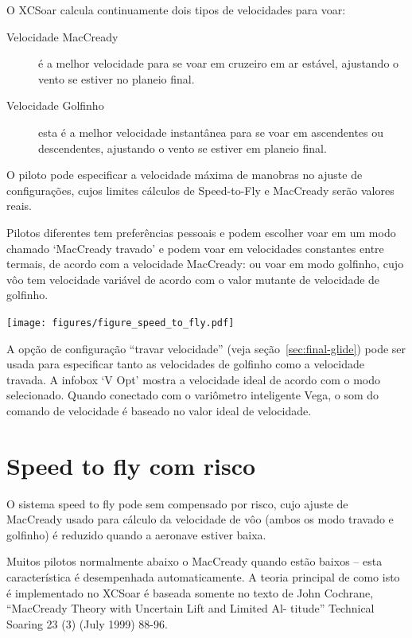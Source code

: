 O XCSoar calcula continuamente dois tipos de velocidades para voar:
\begin{description}
\item[Velocidade MacCready]  é a melhor velocidade para se voar em cruzeiro em ar estável, ajustando o vento se estiver no planeio final.
\item[Velocidade Golfinho]  esta é a melhor velocidade instantânea para se voar em ascendentes ou descendentes, ajustando o vento se estiver em planeio final.
\end{description}  

O piloto pode especificar a velocidade máxima de manobras no ajuste de configurações, cujos limites cálculos de Speed-to-Fly e MacCready serão valores reais.

Pilotos diferentes tem preferências pessoais e podem escolher voar em um modo chamado ‘MacCready travado’ e podem voar em velocidades constantes entre termais, de acordo com a velocidade MacCready: ou voar em modo golfinho, cujo vôo tem velocidade variável de acordo com o valor mutante de velocidade de golfinho. 

\begin{maxipage}
\begin{center}
\texttt{[image: figures/figure\_speed\_to\_fly.pdf]}
\end{center}
\end{maxipage}

A opção de configuração “travar velocidade” (veja seção~\ref{sec:final-glide}) pode ser usada para especificar tanto as velocidades de golfinho como a velocidade travada.  A infobox ‘V Opt’ mostra a velocidade ideal de acordo com o modo selecionado. Quando conectado com o variômetro inteligente Vega, o som do comando de velocidade é baseado no valor ideal de velocidade.


\section{Speed to fly com risco}\label{sec:safety-factor}

 O sistema speed to fly pode sem compensado por risco, cujo ajuste de MacCready usado para cálculo da velocidade de vôo (ambos os modo travado e golfinho) é reduzido quando a aeronave estiver baixa.

Muitos pilotos normalmente abaixo o MacCready quando estão baixos – esta característica é desempenhada automaticamente.  A teoria principal de como isto é implementado no XCSoar é baseada somente no texto de John Cochrane, “MacCready Theory with Uncertain Lift and Limited Al- titude” Technical Soaring 23 (3) (July 1999) 88-96.

